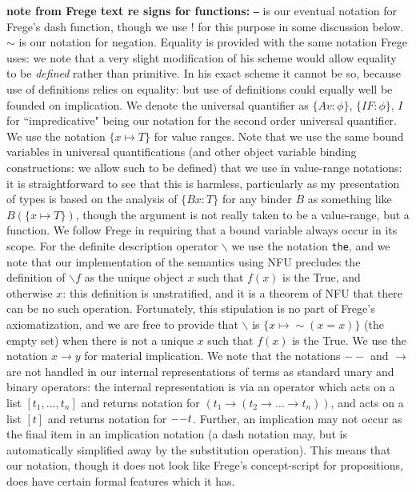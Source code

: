 \documentclass{article}
\begin{document}
{{{\bf note from Frege text re signs for functions:}  {\tt --}  is our eventual notation for Frege's dash function, though we use ! for this purpose in some discussion below.  {\tt $\sim$} is our notation for negation.   Equality is provided with the same notation Frege uses:  we note that a very slight modification of his scheme would allow equality to be {\em defined\/} rather than primitive.  In his exact scheme it cannot be so, because use of definitions relies on equality:  but use of definitions could equally well be founded on implication.  We denote the universal quantifier
as $\{A v : \phi\}$, $\{IF:\phi\}$, $I$ for ``impredicative" being our notation for the second order universal quantifier.  We use the notation $\{x \mapsto T\}$ for value ranges.  Note that
we use the same bound variables in universal quantifications (and other object variable binding constructions:  we allow such to be defined) that we use in value-range notations:  it is straightforward to see that this is harmless, particularly as my presentation of types is based on the analysis of $\{Bx:T\}$ for any binder $B$ as something like $B(\{x \mapsto T\})$, though the argument
is not really taken to be a value-range, but a function.  We follow Frege in requiring that a bound variable always occur in its scope.   For the definite description operator $\backslash$ we use the notation {\tt the}, and we note that our implementation of the semantics using NFU precludes the definition of $\backslash f$ as the unique object $x$ such that $f(x)$ is the True, and otherwise $x$:  this definition is unstratified, and it is a theorem of NFU that there can be no such operation.  Fortunately, this stipulation is no part of Frege's axiomatization, and we are free to provide that $\backslash$ is $\{ x \mapsto \sim(x=x)\}$ (the empty set) when there is not a unique $x$ such that $f(x)$ is the True.  We use the notation $x \rightarrow y$ for material implication.  We note that the notations $--$ and $\rightarrow$ are not handled in our internal representations of terms as standard unary and binary operators:  the internal representation is via an operator which acts on a list $[t_1,\ldots,t_n]$ and returns notation for
$(t_1 \rightarrow (t_2 \rightarrow \ldots \rightarrow t_n))$, and acts on a list $[t]$ and returns notation for ${\tt --}t$.  Further, an implication may not occur as the final item in an implication notation (a dash notation may, but is automatically simplified away by the substitution operation).  This means that our notation, though it does not look like Frege's concept-script for propositions, does have certain formal features which it has.

}}
\end{document}

